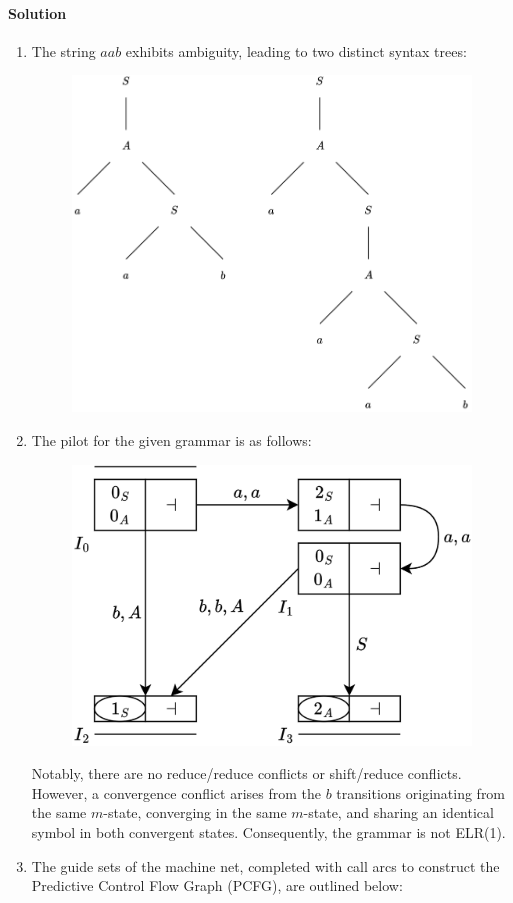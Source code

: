 \paragraph*{Solution}
\begin{enumerate}
    \item The string $aab$ exhibits ambiguity, leading to two distinct syntax trees:
        \begin{figure}[H]
            \centering
            \includegraphics[width=0.75\linewidth]{images/syntax.png}
        \end{figure} 
    \item The pilot for the given grammar is as follows:
        \begin{figure}[H]
            \centering
            \includegraphics[width=0.5\linewidth]{images/synsol.png}
        \end{figure} 
        Notably, there are no reduce/reduce conflicts or shift/reduce conflicts.
        However, a convergence conflict arises from the $b$ transitions originating from the same $m$-state, converging in the same $m$-state, and sharing an identical symbol in both convergent states. 
        Consequently, the grammar is not ELR(1).
    \item The guide sets of the machine net, completed with call arcs to construct the Predictive Control Flow Graph (PCFG), are outlined below:

\end{enumerate}
